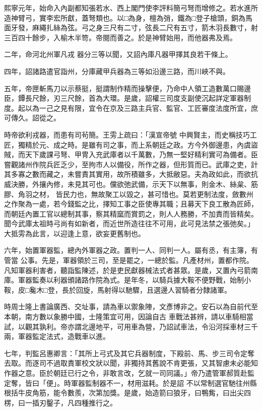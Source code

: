 \begin{pinyinscope}
 熙寧元年，始命入內副都知張若水、西上閣門使李評料簡弓弩而增修之。若水進所造神臂弓，實李宏所獻，蓋弩類也。以□為身，檀為弰，鐵為□登子槍頭，銅為馬面牙發，麻繩扎絲為弦。弓之身三尺有二寸，弦長二尺有五寸，箭木羽長數寸，射三百四十餘步，入榆木半笴。帝閱而善之。於是神臂始用，而他器弗及焉。



 二年，命河北州軍凡戎
 器分三等以聞，又詔內庫凡器甲擇其良若干條上。



 四年，詔諸路遣官詣州，分庫藏甲兵器為三等如沿邊三路，而川峽不與。



 五年，帝匣斬馬刀以示蔡挺，挺謂制作精而操擊便，乃命中人領工造數萬口賜邊臣，鐔長尺餘，刃三尺餘，首為大環。是歲，詔權三司度支副使沉起詳定軍器制度。起以為一己之見有限，宜令在京及三路主兵官、監官、工匠審度法度所宜，庶可傳久。詔從之。



 時帝欲利戎器，而患有司茍簡。王雱上疏曰：「漢宣帝號
 中興賢主，而史稱技巧工匠，獨精於元、成之時。是雖有司之事，而上系朝廷之政。方今外御邊患，內虞盜賊，而天下歲課弓弩、甲冑入充武庫者以千萬數，乃無一堅好精利實可為備者。臣嘗觀諸州作院兵匠乏少，至拘市人以備役，所作之器，但形質而已。武庫之吏，計其多寡之數而藏之，未嘗責其實用，故所積雖多，大抵敝惡。夫為政如此，而欲抗威決勝，外攘內修，未見其可也。儻欲弛武備，示天下以無事，則金木、絲枲、筋膠、角羽之材，
 皆民力也，無故聚工以毀之，甚可惜也。莫若更制法度，斂數州之作聚為一處，若今錢監之比，擇知工事之臣使專其職；且募天下良工散為匠師，而朝廷內置工官以總制其事，察其精窳而賞罰之，則人人務勝，不加責而皆精矣。聞今武庫太祖時弓尚有如新者，而近世所造往往不可用，此可見法禁之張弛矣。」大抵雱為此言，以迎逢上意，欲妄更舊制也。



 六年，始置軍器監，總內外軍器之政。置判一人、同判一人。屬有丞，有主簿，有管當
 公事。先是，軍器領於三司，至是罷之，一總於監。凡產材州，置都作院。凡知軍器利害者，聽詣監陳述，於是吏民獻器械法式者甚眾。是歲，又置內弓箭南庫。軍器監奏以利器頒諸路作院為式。是年冬，以騎兵據大鞍不便野戰，始制小鞍，皮□毚木□登，長於回旋，馬射得以馳驟，且選邊人習騎者分隸諸軍。



 時周士隆上書論廣西、交址事，請為車以禦象陣，文彥博非之。安石以為自前代至本朝，南方數以象勝中國，士隆策宜可用，因論自古
 車戰法甚辨，請以車騎相當試，以觀其孰利。帝亦謂北邊地平，可用車為營，乃詔試車法，令沿河採車材三千兩，軍器監定法式，造戰車以進。



 七年，判監呂惠卿言：「其所上弓式及其它兵器制度，下殿前、馬、步三司令定奪去取。而逐司不過取責軍校文狀以聞，非獨持其舊說不肯更張，又其智慮未必能知作器之意。臣於朝廷已行之令，非敢言改，乞就一司同議。」帝乃遣管軍郝質赴監定奪，皆曰「便」。時軍器監制器不一，材用滋耗。於是詔
 不以常制選官馳往州縣根括牛皮角筋，能令數羨，次第加獎。是歲，始造箭曰狼牙，曰鴨觜，曰出尖四楞，曰一插刃鑿子，凡四種推行之。




\end{pinyinscope}

